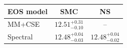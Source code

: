 \renewcommand{\arraystretch}{1.4}
\begin{tabular}{lcc}
    \hline
    EOS model & SMC & NS \\
    \hline
    MM+CSE & $12.51^{+0.31}_{-0.10}$ & -- \\
    Spectral & $12.48^{+0.04}_{-0.03}$ & $12.48^{+0.04}_{-0.02}$ \\
    \hline
\end{tabular}
